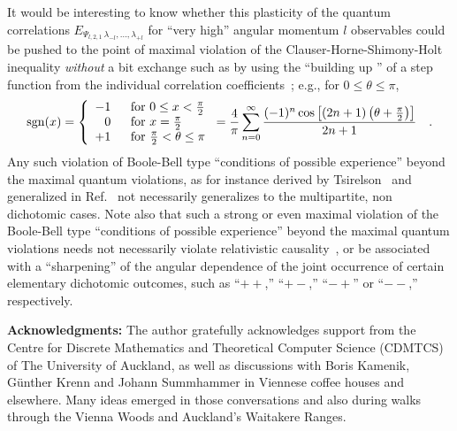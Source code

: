 \documentclass[fleqn,twoside]{article}      %
\begin{document}
It would be interesting to know whether this plasticity of the quantum correlations
$E_{{ \Psi_{l,2,1}}\,\lambda_{-l}, \ldots , \lambda_{+l} }$
for ``very high'' angular momentum $l$ observables
could be pushed to the point of maximal violation of
the Clauser-Horne-Shimony-Holt inequality {\em without} a  bit exchange
such as by using the
``building up '' of a step function from the individual correlation coefficients~\cite{svozil-krenn}; e.g., for  $0 \leq \theta \leq \pi $,
\begin{equation}
{\rm sgn} (x)
=\left\{ \begin{array}{rl}
-1 \; &\text{  for } 0\le x<\frac{\pi}{2} \\
 0 \; &\text{  for }  x=\frac{\pi}{2}  \\
+1 \; &\text{  for }  \frac{\pi}{2} <  \theta \le \pi
   \end{array} \right.
={4\over \pi }\sum_{n=0}^\infty {(-1)^n\cos \left[(2n+1)\left( \theta +\frac{\pi}{2}\right)\right]\over
2n+1}\quad .
\label{e:10}
\end{equation}
Any such violation of Boole-Bell type ``conditions of possible experience'' beyond the maximal quantum
violations, as for instance
derived by Tsirelson~\cite{cirelson} and generalized in Ref.~\cite{filipp-svo-04-qpoly-prl} not necessarily generalizes
to the multipartite, non dichotomic cases.
Note also that such a strong or even maximal violation of the Boole-Bell type ``conditions of possible experience'' beyond the maximal quantum
violations
needs
not necessarily violate relativistic causality~\cite{popescu-97,popescu-97b},
or be associated with a ``sharpening'' of the angular dependence of the joint occurrence of certain elementary dichotomic outcomes,
such as  ``$++$,'' ``$+-$,'' ``$-+$'' or ``$--$,'' respectively.

{\bf Acknowledgments:}
The author gratefully acknowledges support from the Centre for Discrete Mathematics and Theoretical Computer Science (CDMTCS) of
The University of Auckland, as well as discussions with Boris Kamenik, G\"unther Krenn and Johann Summhammer in Viennese coffee houses and elsewhere.
Many ideas emerged in those conversations and also during walks through the Vienna Woods and Auckland's Waitakere Ranges.


%
%
%
\end{document}
